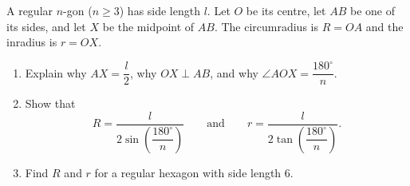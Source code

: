 A regular $n$-gon ($n\ge3$) has side length $l$. Let $O$ be its centre, let $AB$ be one of its sides, and let $X$ be the midpoint of $AB$. The circumradius is $R=OA$ and the inradius is $r=OX$.
\begin{enumerate}
\item[(a)] Explain why $AX=\dfrac {l}{2}$, why $OX\perp AB$, and why $\angle AOX=\dfrac{180^\circ}{n}$.
\item[(b)] Show that
\[R=\dfrac{l}{2\sin\left(\dfrac{180^\circ}{n}\right)}\qquad\text{and}\qquad r=\dfrac{l}{2\tan\left(\dfrac{180^\circ}{n}\right)}.\]
\item[(c)] Find $R$ and $r$ for a regular hexagon with side length $6$.
\end{enumerate}
